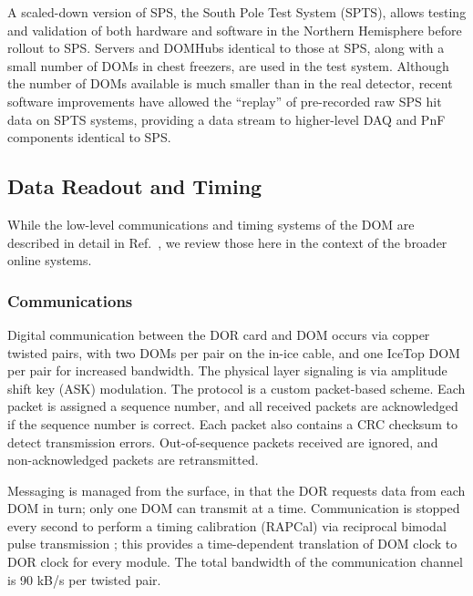 A scaled-down version of SPS, the South Pole Test System (SPTS), allows
testing and validation of both hardware and software in the Northern
Hemisphere before rollout to SPS.  Servers and DOMHubs identical to those
at SPS, along with a small number of DOMs in chest freezers, are used in
the test system.  Although the number of DOMs available is much smaller
than in the real detector, recent software improvements have allowed the
``replay'' of pre-recorded raw SPS hit data on SPTS systems, providing a data stream to
higher-level DAQ and PnF components identical to SPS.

\subsection{Data Readout and Timing}

While the low-level communications and timing systems of the DOM are
described in detail in Ref.~\cite{ref:domdaq}, we review those here in the
context of the broader online systems.

\subsubsection{\label{sect:online:comms}Communications}

Digital communication between the DOR card and DOM occurs via copper
twisted pairs, with two DOMs per pair on the in-ice cable, and one IceTop
DOM per pair for increased bandwidth.  The physical
layer signaling is via amplitude shift key (ASK) modulation.  The protocol
is a custom packet-based scheme.  Each packet is assigned a sequence 
number, and all received packets are acknowledged if the sequence number is
correct.  Each packet also contains a CRC checksum to detect transmission
errors.  Out-of-sequence packets received are ignored, and non-acknowledged
packets are retransmitted.  

Messaging is managed from the surface, in that the DOR requests data
from each DOM in turn; only one DOM can transmit at a time.  Communication
is stopped every second to perform a timing calibration (RAPCal) via
reciprocal bimodal pulse transmission \cite{ref:domdaq}; this provides a
time-dependent translation of DOM clock to DOR clock for every module.  The
total bandwidth of the communication channel is 90 kB/s per twisted pair.  




